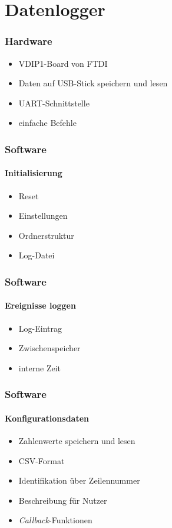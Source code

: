 \section{Datenlogger}



\begin{frame}
	
	
	\frametitle{Hardware}	
	\begin{itemize}
		\item VDIP1-Board von FTDI
		\item Daten auf USB-Stick speichern und lesen
		\item UART-Schnittstelle
		\item einfache Befehle
	\end{itemize}
\end{frame}

\begin{frame}
	
	
	\frametitle{Software}
	\framesubtitle{Initialisierung}
	\begin{itemize}
		\item Reset
		\item Einstellungen
		\item Ordnerstruktur
		\item Log-Datei
	\end{itemize}
\end{frame}

\begin{frame}
	
	
	\frametitle{Software}
	\framesubtitle{Ereignisse loggen}
	\begin{itemize}
		\item Log-Eintrag
		\item Zwischenspeicher
		\item interne Zeit
	\end{itemize}
\end{frame}

\begin{frame}
	
	
	\frametitle{Software}
	\framesubtitle{Konfigurationsdaten}
	\begin{itemize}
		\item Zahlenwerte speichern und lesen
		\item CSV-Format
		\item Identifikation über Zeilennummer
		\item Beschreibung für Nutzer
		\item \textit{Callback}-Funktionen
	\end{itemize}
\end{frame}

